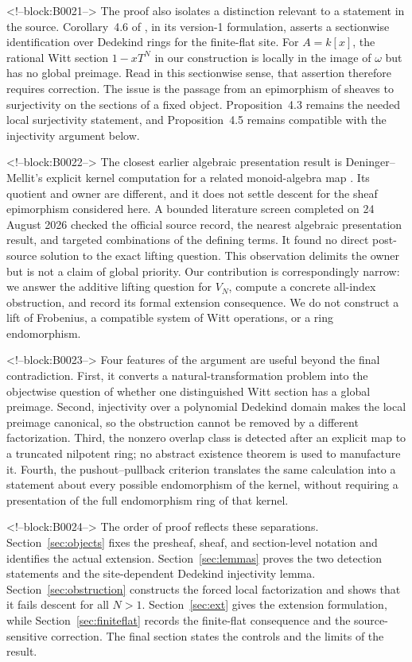 \documentclass[11pt]{article}
\theoremstyle{definition}
\begin{document}
<!--block:B0021-->
The proof also isolates a distinction relevant to a statement in the
source.  Corollary~4.6 of
\cite[p.~23]{Deninger2025Rational}, in its version-1 formulation, asserts a
sectionwise identification over Dedekind rings for the finite-flat site.
For \(A=k[x]\), the rational Witt section \(1-xT^N\) in our construction is
locally in the image of \(\omega\) but has no global preimage.  Read in this
sectionwise sense, that assertion therefore requires correction.  The
issue is the passage from an epimorphism of sheaves to surjectivity on the
sections of a fixed object.  Proposition~4.3 remains the needed local
surjectivity statement, and Proposition~4.5 remains compatible with the
injectivity argument below.

<!--block:B0022-->
The closest earlier algebraic presentation result is Deninger--Mellit's
explicit kernel computation for a related monoid-algebra map
\cite[Thm.~1.1]{DeningerMellit2019}.  Its quotient and owner are different,
and it does not settle descent for the sheaf epimorphism considered here.
A bounded literature screen completed on 24 August 2026 checked the
official source record, the nearest algebraic presentation result, and
targeted combinations of the defining terms.  It found no direct
post-source solution to the exact lifting question.  This observation
delimits the owner but is not a claim of global priority.
Our contribution is correspondingly narrow: we answer the additive lifting
question for \(V_N\), compute a concrete all-index obstruction, and record
its formal extension consequence.  We do not construct a lift of
Frobenius, a compatible system of Witt operations, or a ring endomorphism.

<!--block:B0023-->
Four features of the argument are useful beyond the final contradiction.
First, it converts a natural-transformation problem into the objectwise
question of whether one distinguished Witt section has a global preimage.
Second, injectivity over a polynomial Dedekind domain makes the local
preimage canonical, so the obstruction cannot be removed by a different
factorization.  Third, the nonzero overlap class is detected after an
explicit map to a truncated nilpotent ring; no abstract existence theorem
is used to manufacture it.  Fourth, the pushout--pullback criterion
translates the same calculation into a statement about every possible
endomorphism of the kernel, without requiring a presentation of the full
endomorphism ring of that kernel.

<!--block:B0024-->
The order of proof reflects these separations.  Section~\ref{sec:objects}
fixes the presheaf, sheaf, and section-level notation and identifies the
actual extension.  Section~\ref{sec:lemmas} proves the two detection
statements and the site-dependent Dedekind injectivity lemma.
Section~\ref{sec:obstruction} constructs the forced local factorization and
shows that it fails descent for all \(N>1\).
Section~\ref{sec:ext} gives the extension formulation, while
Section~\ref{sec:finiteflat} records the finite-flat consequence and the
source-sensitive correction.  The final section states the controls and
the limits of the result.
\end{document}
